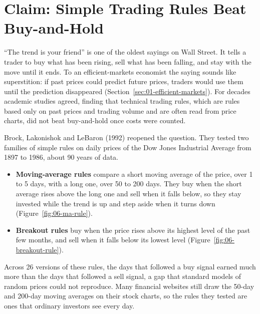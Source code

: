 \makeatletter
\makeatother

\chapter{Claim: Simple Trading Rules Beat Buy-and-Hold}
\label{ch:08}

``The trend is your friend'' is one of the oldest sayings on Wall Street. It tells a trader to buy what has been rising, sell what has been falling, and stay with the move until it ends. To an efficient-markets economist the saying sounds like superstition: if past prices could predict future prices, traders would use them until the prediction disappeared (Section~\ref{sec:01-efficient-markets}). For decades academic studies agreed, finding that technical trading rules, which are rules based only on past prices and trading volume and are often read from price charts, did not beat buy-and-hold once costs were counted. 

Brock, Lakonishok and LeBaron (1992) reopened the question. They tested two families of simple rules on daily prices of the Dow Jones Industrial Average from 1897 to 1986, about 90 years of data. 
\begin{itemize}
\item \textbf{Moving-average rules} compare a short moving average of the price, over 1 to 5 days, with a long one, over 50 to 200 days. They buy when the short average rises above the long one and sell when it falls below, so they stay invested while the trend is up and step aside when it turns down (Figure~\ref{fig:06-ma-rule}). 
\item \textbf{Breakout rules} buy when the price rises above its highest level of the past few months, and sell when it falls below its lowest level (Figure~\ref{fig:06-breakout-rule}).
\end{itemize}
Across 26 versions of these rules, the days that followed a buy signal earned much more than the days that followed a sell signal, a gap that standard models of random prices could not reproduce. Many financial websites still draw the 50-day and 200-day moving averages on their stock charts, so the rules they tested are ones that ordinary investors see every day.


